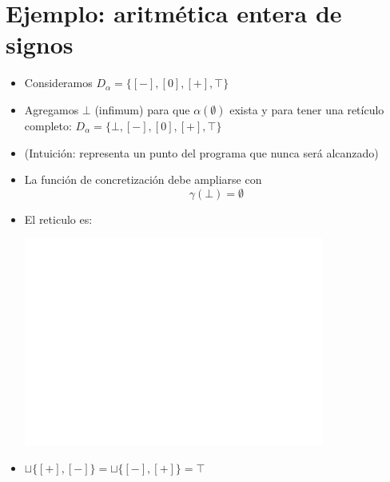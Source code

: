 \documentclass[11pt]{article}
\begin{document}
\section*{Ejemplo: aritmética entera de signos}
\label{sec:org2b2053f}
\begin{itemize}
\item Consideramos \(D_\alpha = \{[-], [0], [+],\top\}\)
\end{itemize}
\begin{itemize}
\item Agregamos \(\bot\) (infimum) para que \(\alpha(\emptyset)\) exista y
para tener una retículo completo: \(D_\alpha = \{\bot, [-], [0],
    [+], \top\}\)
\item (Intuición: representa un punto del programa que nunca será alcanzado)
\item La función de concretización debe ampliarse con $$\gamma(\bot) =
    \emptyset$$
\item El reticulo es:
\begin{center}
\includegraphics[width=.9\linewidth]{reticulo2.png}
\end{center}
\item \(\sqcup\{[+],[-]\} = \sqcup\{[-],[+]\} = \top\)
\end{itemize}
\end{document}
